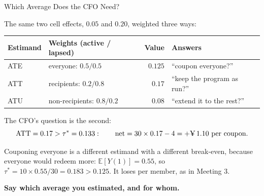 \documentclass[aspectratio=169, 11pt, handout]{beamer}
\newcommand{\E}{\mathbb{E}}
\newcommand{\ATT}{\text{ATT}}
\begin{document}
\begin{frame}{Which Average Does the CFO Need?}

The same two cell effects, $0.05$ and $0.20$, weighted three ways:

\begin{center}
\begin{tabular}{llrl}
\toprule
\textbf{Estimand} & \textbf{Weights (active / lapsed)} & \textbf{Value} & \textbf{Answers} \\
\midrule
ATE & everyone: $0.5 / 0.5$ & $0.125$ & ``coupon everyone?'' \\
ATT & recipients: $0.2 / 0.8$ & $\mathbf{0.17}$ & ``keep the program as run?'' \\
ATU & non-recipients: $0.8 / 0.2$ & $0.08$ & ``extend it to the rest?'' \\
\bottomrule
\end{tabular}
\end{center}

\medskip

The CFO's question is the second:
\[
\ATT = 0.17 > \tau^\ast = 0.133: \qquad \text{net} = 30 \times 0.17 - 4 = +\text{\textyen}\,1.10 \text{ per coupon}.
\]

Couponing everyone is a different estimand with a different break-even, because everyone would redeem more: $\E[Y(1)] = 0.55$, so $\tau^\ast = 10 \times 0.55/30 = 0.183 > 0.125$. It loses  per member, as in Meeting 3.

\medskip

\begin{center}
\textbf{Say which average you estimated, and for whom.}
\end{center}
\end{frame}
\end{document}
